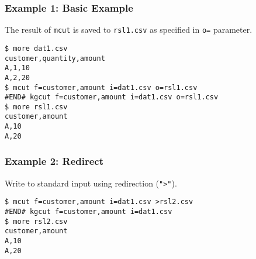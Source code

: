 \subsubsection*{Example 1: Basic Example}

The result of \verb|mcut| is saved to \verb|rsl1.csv| as specified in \verb|o=| parameter.


\begin{Verbatim}[baselinestretch=0.7,frame=single]
$ more dat1.csv
customer,quantity,amount
A,1,10
A,2,20
$ mcut f=customer,amount i=dat1.csv o=rsl1.csv
#END# kgcut f=customer,amount i=dat1.csv o=rsl1.csv
$ more rsl1.csv
customer,amount
A,10
A,20
\end{Verbatim}
\subsubsection*{Example 2: Redirect}

Write to standard input using redirection (\verb|">"|).


\begin{Verbatim}[baselinestretch=0.7,frame=single]
$ mcut f=customer,amount i=dat1.csv >rsl2.csv
#END# kgcut f=customer,amount i=dat1.csv
$ more rsl2.csv
customer,amount
A,10
A,20
\end{Verbatim}
